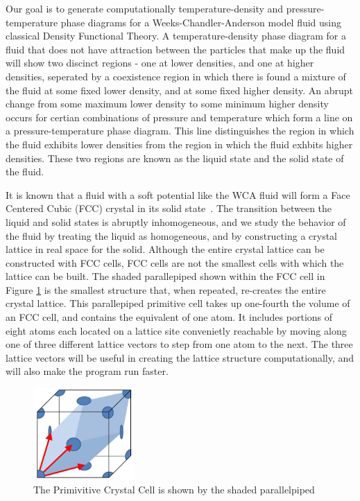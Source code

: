 \documentclass[double,12pt]{beavtex}
\begin{document}
Our goal is to generate computationally temperature-density and pressure-
temperature phase diagrams for a Weeks-Chandler-Anderson model fluid using 
classical Density Functional Theory. 
A temperature-density phase diagram for a fluid that does not
have attraction between the particles that make up the fluid will show
two discinct regions - one at lower densities, and one at higher densities,
seperated by a coexistence region in which there is found a mixture of the 
fluid at some fixed lower density, and at some fixed higher density. An 
abrupt change from some maximum lower density to some minimum higher density 
occurs for certian combinations of pressure and temperature which form
a line on a pressure-temperature phase diagram. This line distinguishes 
the region in which the fluid exhibits lower densities from the region 
in which the fluid exhbits higher densities. These two regions are known
as the liquid state and the solid state of the fluid.

It is known that a fluid with a soft potential like the WCA fluid will 
form a Face Centered Cubic (FCC) crystal in its solid state~\cite{Hansen}. 
The transition between the liquid 
and solid states is abruptly inhomogeneous, and we study the behavior 
of the fluid by treating the liquid as homogeneous, and by constructing 
a crystal lattice in real space for the solid. Although the entire 
crystal lattice can be constructed with FCC cells, 
FCC cells are not the smallest cells with which the lattice can be built. 
The shaded parallepiped shown within the FCC cell in Figure \ref{fig:primitivecell} 
is the smallest structure that, when repeated, re-creates the entire crystal 
lattice. This parallepiped primitive cell takes up one-fourth the volume 
of an FCC cell, and contains the equivalent of one atom.
It includes portions of eight atoms each located on a lattice site convenietly 
reachable by moving along one of three different lattice vectors to step 
from one atom to the next. The three lattice vectors will be useful in 
creating the lattice structure computationally, and will also make the 
program run faster.

  \begin{figure}[h!]
    \centering
    \includegraphics[height=3.5cm]{PrimitiveCellLightBlue.png}
    \caption{The Primivitive Crystal Cell is shown by the shaded parallelpiped}
    \label{fig:primitivecell}
  \end{figure}
\end{document}
